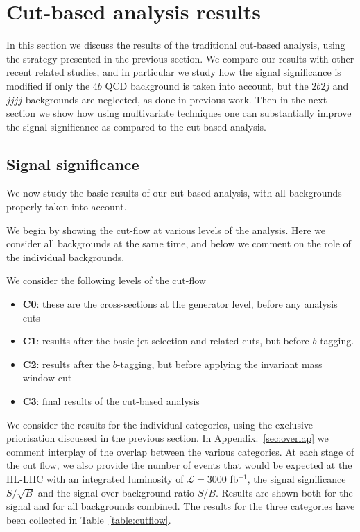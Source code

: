 
\section{Cut-based analysis results}

\label{sec:results}

In this section we discuss the results of the traditional
cut-based analysis, using the strategy presented in the previous
section.
%
We compare our results with other recent related studies,
and in particular we study how the signal significance
is modified if only the $4b$ QCD background is taken into account,
but the $2b2j$ and $jjjj$ backgrounds are neglected, as done
in previous work.
%
Then in the next section we show how using multivariate techniques
one can substantially improve the signal significance as compared
to the cut-based analysis.



\subsection{Signal significance}

We now study the basic results of our cut based analysis, with
all backgrounds properly taken into account.

We begin by showing the cut-flow at various levels of the analysis.
%
Here we consider all backgrounds at the same time, and below
we comment on the role of the individual backgrounds.

We consider the following levels of the cut-flow
\begin{itemize}
\item {\bf C0}: these are the cross-sections at the generator
  level, before any analysis cuts
\item {\bf C1}: results after the basic jet selection
  and related cuts, but before $b$-tagging.
\item {\bf C2}: results after the $b$-tagging, but
  before applying the invariant mass window cut
\item {\bf C3}: final results of the cut-based
  analysis
  \end{itemize}
We consider the results for the individual categories, using the
exclusive priorisation discussed in the previous section.
%
In Appendix.~\ref{sec:overlap} we comment
interplay of the overlap between the various categories.
%
At each stage of the cut flow, we also provide the number
of events that would be expected at the HL-LHC with
an integrated luminosity of $\mathcal{L}=3000$ fb$^{-1}$,
the signal significance $S/\sqrt{B}$ and the signal
over background ratio $S/B$.
%
Results are shown both for the signal and for all backgrounds
combined.
%
The results for the three categories have been collected in
Table~\ref{table:cutflow}.

